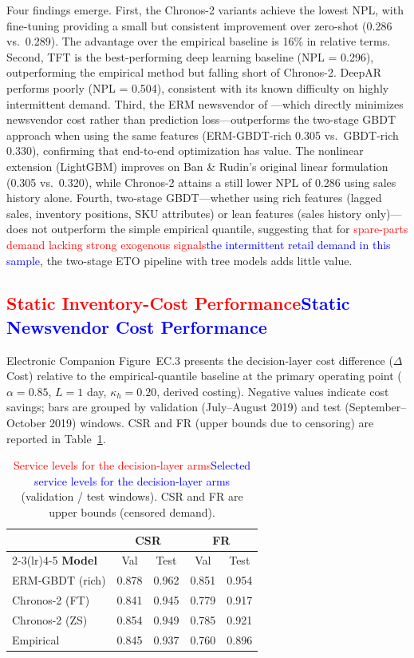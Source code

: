 \documentclass[msom,dblanonrev]{informs4}
\newcommand{\add}[1]{\textcolor{blue}{#1}}
\newcommand{\reduce}[1]{\textcolor{red}{#1}\hspace{0.5em}}
\begin{document}
Four findings emerge.
First, the Chronos-2 variants achieve the lowest NPL, with fine-tuning providing a small but consistent improvement over zero-shot (0.286 vs.\ 0.289).
The advantage over the empirical baseline is 16\% in relative terms.
Second, TFT is the best-performing deep learning baseline (NPL = 0.296), outperforming the empirical method but falling short of Chronos-2.
DeepAR performs poorly (NPL = 0.504), consistent with its known difficulty on highly intermittent demand.
Third, the ERM newsvendor of \citet{BanRudin2019}---which directly minimizes newsvendor cost rather than prediction loss---outperforms the two-stage GBDT approach when using the same features (ERM-GBDT-rich 0.305 vs.\ GBDT-rich 0.330), confirming that end-to-end optimization has value.
The nonlinear extension (LightGBM) improves on Ban \& Rudin's original linear formulation (0.305 vs.\ 0.320), while Chronos-2 attains a still lower NPL of 0.286 using sales history alone.
Fourth, two-stage GBDT---whether using rich features (lagged sales, inventory positions, SKU attributes) or lean features (sales history only)---does not outperform the simple empirical quantile, suggesting that for \reduce{spare-parts demand lacking strong exogenous signals}\add{the intermittent retail demand in this sample}, the two-stage ETO pipeline with tree models adds little value.

\subsection{\reduce{Static Inventory-Cost Performance}\add{Static Newsvendor Cost Performance}}

Electronic Companion Figure~EC.3 presents the decision-layer cost difference ($\Delta$Cost) relative to the empirical-quantile baseline at the primary operating point ($\alpha = 0.85$, $L = 1$ day, $\kappa_h = 0.20$, derived costing).
Negative values indicate cost savings; bars are grouped by validation (July--August 2019) and test (September--October 2019) windows.
CSR and FR (upper bounds due to censoring) are reported in Table~\ref{tab:layer_c_service}.

\begin{table}[ht]
\caption{\reduce{Service levels for the decision-layer arms}\add{Selected service levels for the decision-layer arms} (validation / test windows). CSR and FR are upper bounds (censored demand).}\label{tab:layer_c_service}
\centering\small
\begin{tabular}{lcccc}
\toprule
& \multicolumn{2}{c}{\textbf{CSR}} & \multicolumn{2}{c}{\textbf{FR}} \\
\cmidrule(lr){2-3}\cmidrule(lr){4-5}
\textbf{Model} & Val & Test & Val & Test \\
\midrule
ERM-GBDT (rich)  & 0.878 & 0.962 & 0.851 & 0.954 \\
Chronos-2 (FT) & 0.841 & 0.945 & 0.779 & 0.917 \\
Chronos-2 (ZS) & 0.854 & 0.949 & 0.785 & 0.921 \\
Empirical      & 0.845 & 0.937 & 0.760 & 0.896 \\
\bottomrule
\end{tabular}
\end{table}
\end{document}
